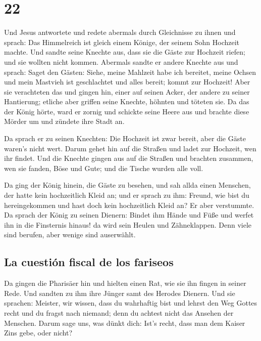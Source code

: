 \hypertarget{section-21}{%
\section{22}\label{section-21}}

 Und Jesus antwortete und redete abermals durch
Gleichnisse zu ihnen und sprach:  Das Himmelreich ist
gleich einem Könige, der seinem Sohn Hochzeit machte.  Und
sandte seine Knechte aus, dass sie die Gäste zur Hochzeit riefen; und
sie wollten nicht kommen.  Abermals sandte er andere
Knechte aus und sprach: Saget den Gästen: Siehe, meine Mahlzeit habe ich
bereitet, meine Ochsen und mein Mastvieh ist geschlachtet und alles
bereit; kommt zur Hochzeit!  Aber sie verachteten das und
gingen hin, einer auf seinen Acker, der andere zu seiner Hantierung;
 etliche aber griffen seine Knechte, höhnten und töteten
sie.  Da das der König hörte, ward er zornig und schickte
seine Heere aus und brachte diese Mörder um und zündete ihre Stadt an.

 Da sprach er zu seinen Knechten: Die Hochzeit ist zwar
bereit, aber die Gäste waren's nicht wert.  Darum gehet
hin auf die Straßen und ladet zur Hochzeit, wen ihr findet.
 Und die Knechte gingen aus auf die Straßen und brachten
zusammen, wen sie fanden, Böse und Gute; und die Tische wurden alle
voll.

 Da ging der König hinein, die Gäste zu besehen, und sah
allda einen Menschen, der hatte kein hochzeitlich Kleid an;
 und er sprach zu ihm: Freund, wie bist du hereingekommen
und hast doch kein hochzeitlich Kleid an? Er aber verstummte.
 Da sprach der König zu seinen Dienern: Bindet ihm Hände
und Füße und werfet ihn in die Finsternis hinaus! da wird sein Heulen
und Zähneklappen.  Denn viele sind berufen, aber wenige
sind auserwählt.

\hypertarget{la-cuestiuxf3n-fiscal-de-los-fariseos}{%
\subsection{La cuestión fiscal de los
fariseos}\label{la-cuestiuxf3n-fiscal-de-los-fariseos}}

 Da gingen die Pharisäer hin und hielten einen Rat, wie
sie ihn fingen in seiner Rede.  Und sandten zu ihm ihre
Jünger samt des Herodes Dienern. Und sie sprachen: Meister, wir wissen,
dass du wahrhaftig bist und lehrst den Weg Gottes recht und du fragst
nach niemand; denn du achtest nicht das Ansehen der Menschen.
 Darum sage uns, was dünkt dich: Ist's recht, dass man
dem Kaiser Zins gebe, oder nicht?

